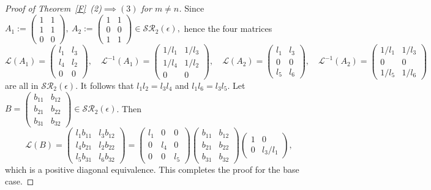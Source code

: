 \documentclass[11pt,reqno]{amsart}
\theoremstyle{plain}
\theoremstyle{definition}
\numberwithin{equation}{section}
\begin{document}
\begin{proof}[Proof of Theorem~\ref{F}~(2)$\implies(3)$ for $m\neq n$]
	Since $A_1:=\begin{pmatrix}
		1 & 1 \\
		1 & 1 \\
		0 & 0
	\end{pmatrix}, \ A_2:=\begin{pmatrix}
		1 & 1 \\
		0 & 0 \\
		1 & 1
	\end{pmatrix} \in \mathcal{SR}_2(\epsilon),$ hence the four matrices
	\[
	\mathcal{L}(A_1) = \begin{pmatrix}
		l_{1} & l_{3} \\
		l_{4} & l_{2} \\
		0 & 0
	\end{pmatrix}, \quad \mathcal{L}^{-1}(A_1)=\begin{pmatrix}
		1/l_1 & 1/l_3 \\
		1/l_4 & 1/l_2 \\
		0 & 0
	\end{pmatrix}, \quad
	\mathcal{L}(A_2) = \begin{pmatrix}
		l_{1} & l_{3} \\
		0 & 0 \\
		l_{5} & l_{6}
	\end{pmatrix}, \quad \mathcal{L}^{-1}(A_2)=\begin{pmatrix}
		1/l_1 & 1/l_3 \\
		0 & 0   \\
		1/l_5 & 1/l_6
	\end{pmatrix}
	\]
	are all in $\mathcal{SR}_2(\epsilon)$. It follows that $l_{1}l_{2}=l_{3}l_{4}$ and $l_{1}l_{6}=l_{3}l_{5}$. Let $B=\begin{pmatrix}
			b_{11} & b_{12} \\
			b_{21} & b_{22} \\
			b_{31} & b_{32}
		\end{pmatrix}\in \mathcal{SR}_2(\epsilon)$. Then
	\[\mathcal{L}(B)=\begin{pmatrix}
		l_{1}b_{11} & l_{3}b_{12} \\
		l_{4}b_{21} & l_{2}b_{22} \\
		l_{5}b_{31} & l_{6}b_{32}
	\end{pmatrix} = \begin{pmatrix}
		l_{1} & 0 & 0 \\
		0 & l_{4} & 0 \\
		0 & 0 & l_{5}
	\end{pmatrix}\begin{pmatrix}
		b_{11} & b_{12} \\
		b_{21} & b_{22} \\
		b_{31} & b_{32}
	\end{pmatrix}\begin{pmatrix}
		1 & 0  \\
		0 & l_{3}/l_{1}
	\end{pmatrix},\] 
	which is a positive diagonal equivalence. This completes the proof for the base case.
	

\end{proof}
\end{document}
